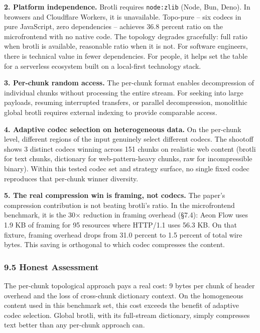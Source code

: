 \documentclass[
  11pt,
]{article}
\begin{document}
\textbf{2. Platform independence.} Brotli requires \texttt{node:zlib}
(Node, Bun, Deno). In browsers and Cloudflare Workers, it is
unavailable. Topo-pure -- six codecs in pure JavaScript, zero
dependencies -- achieves 36.8 percent ratio on the microfrontend with no
native code. The topology degrades gracefully: full ratio when brotli is
available, reasonable ratio when it is not. For software engineers,
there is technical value in fewer dependencies. For people, it helps set
the table for a serverless ecosystem built on a local-first technology
stack.

\textbf{3. Per-chunk random access.} The per-chunk format enables
decompression of individual chunks without processing the entire stream.
For seeking into large payloads, resuming interrupted transfers, or
parallel decompression, monolithic global brotli requires external
indexing to provide comparable access.

\textbf{4. Adaptive codec selection on heterogeneous data.} On the
per-chunk level, different regions of the input genuinely select
different codecs. The shootoff shows 3 distinct codecs winning across
151 chunks on realistic web content (brotli for text chunks, dictionary
for web-pattern-heavy chunks, raw for incompressible binary). Within
this tested codec set and strategy surface, no single fixed codec
reproduces that per-chunk winner diversity.

\textbf{5. The real compression win is framing, not codecs.} The paper's
compression contribution is not beating brotli's ratio. In the
microfrontend benchmark, it is the 30× reduction in framing overhead
(§7.4): Aeon Flow uses 1.9 KB of framing for 95 resources where HTTP/1.1
uses 56.3 KB. On that fixture, framing overhead drops from 31.0 percent
to 1.5 percent of total wire bytes. This saving is orthogonal to which
codec compresses the content.

\subsubsection{9.5 Honest Assessment}\label{honest-assessment}

The per-chunk topological approach pays a real cost: 9 bytes per chunk
of header overhead and the loss of cross-chunk dictionary context. On
the homogeneous content used in this benchmark set, this cost exceeds
the benefit of adaptive codec selection. Global brotli, with its
full-stream dictionary, simply compresses text better than any per-chunk
approach can.
\end{document}
